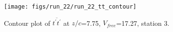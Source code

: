 \begin{figure}[H]
\centering
\texttt{[image: figs/run\_22/run\_22\_tt\_contour]}
\caption{Contour plot of $\overline{t^\prime t^\prime}$ at $z/c$=7.75, $V_{free}$=17.27, station 3.}
\label{fig:run_22_tt_contour}
\end{figure}


